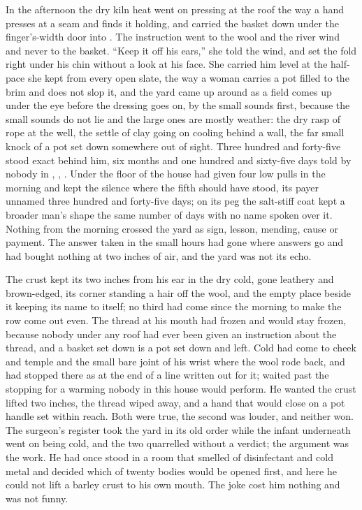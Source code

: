 In the afternoon the dry kiln heat went on pressing at the roof the way a hand presses at a seam and finds it holding, and  carried the basket down under the finger's-width door into . The instruction went to the wool and the river wind and never to the basket. “Keep it off his ears,” she told the wind, and set the fold right under his chin without a look at his face. She carried him level at the half-pace she kept from every open slate, the way a woman carries a pot filled to the brim and does not slop it, and the yard came up around  as a field comes up under the eye before the dressing goes on, by the small sounds first, because the small sounds do not lie and the large ones are mostly weather: the dry rasp of rope at the well, the settle of clay going on cooling behind a wall, the far small knock of a pot set down somewhere out of sight. Three hundred and forty-five stood exact behind him, six months and one hundred and sixty-five days told by nobody in , , . Under the floor of the house  had given four low pulls in the morning and kept the silence where the fifth should have stood, its payer unnamed three hundred and forty-five days; on its peg the salt-stiff coat kept a broader man's shape the same number of days with no name spoken over it. Nothing from the morning crossed the yard as sign, lesson, mending, cause or payment. The answer taken in the small hours had gone where answers go and had bought nothing at two inches of air, and the yard was not its echo.

The crust kept its two inches from his ear in the dry cold, gone leathery and brown-edged, its corner standing a hair off the wool, and the empty place beside it keeping its name to itself; no third had come since the morning to make the row come out even. The thread at his mouth had frozen and would stay frozen, because nobody under any roof had ever been given an instruction about the thread, and a basket set down is a pot set down and left. Cold had come to cheek and temple and the small bare joint of his wrist where the wool rode back, and had stopped there as at the end of a line written out for it;  waited past the stopping for a warming nobody in this house would perform. He wanted the crust lifted two inches, the thread wiped away, and a hand that would close on a pot handle set within reach. Both were true, the second was louder, and neither won. The surgeon's register took the yard in its old order while the infant underneath went on being cold, and the two quarrelled without a verdict; the argument was the work. He had once stood in a room that smelled of disinfectant and cold metal and decided which of twenty bodies would be opened first, and here he could not lift a barley crust to his own mouth. The joke cost him nothing and was not funny.

